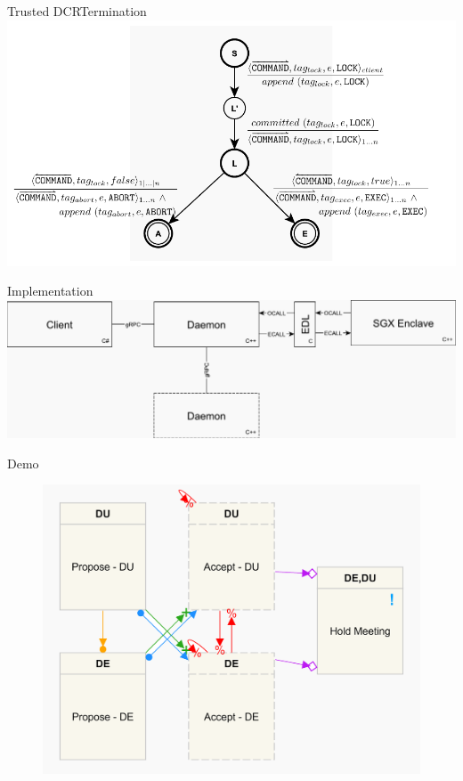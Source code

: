 \documentclass{beamer}
\begin{document}
\begin{frame}{Trusted DCR}{Termination}%
  \vfill
  \includegraphics[width=\textwidth]{figures/raft-2pc.pdf}
  \vfill
\end{frame}

\begin{frame}{Implementation}%
  \vfill
  \includegraphics[width=\textwidth]{figures/network-stack.pdf}
  \vfill
\end{frame}

\begin{frame}{Demo}%
  \begin{figure}[p]
    \includegraphics[scale=0.13]{figures/example6.png}
  \end{figure}
\end{frame}
\end{document}
